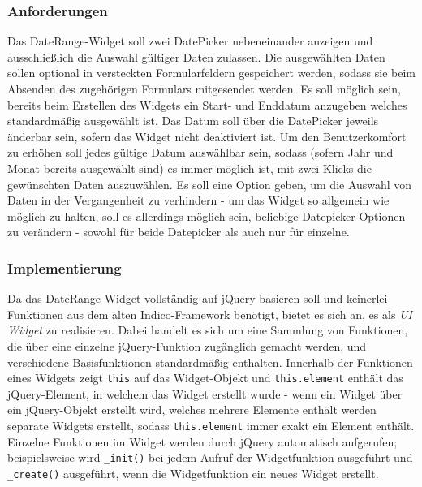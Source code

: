 \subsubsection{Anforderungen}

Das DateRange-Widget soll zwei DatePicker nebeneinander anzeigen und ausschließlich die Auswahl
gültiger Daten zulassen. Die ausgewählten Daten sollen optional in versteckten Formularfeldern
gespeichert werden, sodass sie beim Absenden des zugehörigen Formulars mitgesendet werden. Es soll
möglich sein, bereits beim Erstellen des Widgets ein Start- und Enddatum anzugeben welches
standardmäßig ausgewählt ist. Das Datum soll über die DatePicker jeweils änderbar sein, sofern das
Widget nicht deaktiviert ist. Um den Benutzerkomfort zu erhöhen soll jedes gültige Datum auswählbar
sein, sodass (sofern Jahr und Monat bereits ausgewählt sind) es immer möglich ist, mit zwei Klicks
die gewünschten Daten auszuwählen. Es soll eine Option geben, um die Auswahl von Daten in der
Vergangenheit zu verhindern - um das Widget so allgemein wie möglich zu halten, soll es allerdings
möglich sein, beliebige Datepicker-Optionen zu verändern - sowohl für beide Datepicker als auch nur
für einzelne.

\subsubsection{Implementierung}

Da das DateRange-Widget vollständig auf jQuery basieren soll und keinerlei Funktionen aus dem
alten Indico-Framework benötigt, bietet es sich an, es als \emph{UI Widget} zu realisieren. Dabei
handelt es sich um eine Sammlung von Funktionen, die über eine einzelne jQuery-Funktion zugänglich
gemacht werden, und verschiedene Basisfunktionen standardmäßig enthalten. Innerhalb der Funktionen
eines Widgets zeigt \lstinline{this} auf das Widget-Objekt und \lstinline{this.element} enthält das
jQuery-Element, in welchem das Widget erstellt wurde - wenn ein Widget über ein jQuery-Objekt
erstellt wird, welches mehrere Elemente enthält werden separate Widgets erstellt, sodass
\lstinline{this.element} immer exakt ein Element enthält. Einzelne Funktionen im Widget werden durch
jQuery automatisch aufgerufen; beispielsweise wird \lstinline{_init()} bei jedem Aufruf der
Widgetfunktion ausgeführt und \lstinline{_create()} ausgeführt, wenn die Widgetfunktion ein neues
Widget erstellt.

